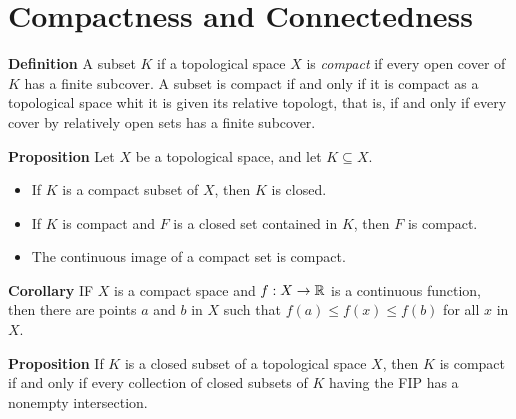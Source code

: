 \section*{Compactness and Connectedness}

\textbf{Definition} A subset $K$ if a topological space $X$ is \textit{compact} if every open cover of $K$  has a finite subcover. A subset is compact if and only if it is compact as a topological space whit it is given its relative topologt, that is, if and only if every cover by relatively open sets has a finite subcover. 

\textbf{Proposition} Let $X$ be a topological space, and let $ K \subseteq X $.
\begin{itemize}
	\item If $K$ is a compact subset of $X$, then $K$ is closed.
	\item If $K$ is compact and $F$ is a closed set contained in $K$, then $F$ is compact.
	\item The continuous image of a compact set is compact.
\end{itemize}

\textbf{Corollary } IF $X$ is a compact space and $ f:X \rightarrow \mathbb{R} $ is a continuous function, then there are points $a$ and $b$ in $X$ such that $ f(a) \leq f(x) \leq f(b) $ for all $x$ in $X$.

\textbf{Proposition} If $ K $ is a closed subset of a topological space $X$, then $K$ is compact if and only if every collection of closed subsets of $K$  having the FIP has a nonempty intersection.
